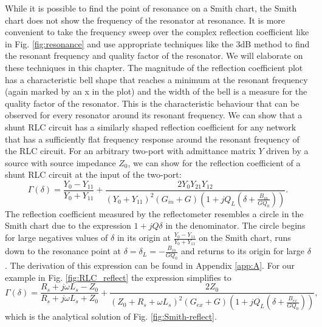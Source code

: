 While it is possible to find the point of resonance on a Smith chart, the Smith chart does not show the frequency of the resonator at resonance. It is more convenient to take the frequency sweep over the complex reflection coefficient like in Fig. \ref{fig:resonance} and use appropriate techniques like the 3dB method to find the resonant frequency and quality factor of the resonator. We will elaborate on these techniques in this chapter. The magnitude of the reflection coefficient plot has a characteristic bell shape that reaches a minimum at the resonant frequency (again marked by an x in the plot) and the width of the bell is a measure for the quality factor of the resonator. This is the characteristic behaviour that can be observed for every resonator around its resonant frequency. We can show that a shunt RLC circuit has a similarly shaped reflection coefficient for any network that has a sufficiently flat frequency response around the resonant frequency of the RLC circuit.
For an arbitrary two-port with admittance matrix $Y$ driven by a source with source impedance $Z_0$, we can show for the reflection coefficient of a shunt RLC circuit at the input of the two-port:
\begin{equation}\label{eq:gamma_r}
\Gamma(\delta)=\frac{Y_0-Y_{11}}{Y_0+Y_{11}}+\frac{2Y_0Y_{21}Y_{12}}{(Y_0+Y_{11})^2(G_{in}+G)(1+jQ_L(\delta+\frac{B_{in}}{GQ_0}))}\text{.}
\end{equation}
The reflection coefficient measured by the reflectometer resembles a circle in the Smith chart due to the expression $1+jQ\delta$ in the denominator. The circle begins for large negatives values of $\delta$ in its origin at $\frac{Y_0-Y_{11}}{Y_0+Y_{11}}$ on the Smith chart, runs down to the resonance point at $\delta=\delta_L=-\frac{B_{in}}{GQ_0} $ and returns to its origin for large $\delta$. The derivation of this expression can be found in Appendix \ref{app:A}. For our example in Fig. \ref{fig:RLC_reflect} the expression simplifies to
\begin{equation}\label{eq:gamma_rlc}
\Gamma(\delta)=\frac{R_s+j\omega L_s-Z_0}{R_s+j\omega L_s+Z_0}+\frac{2Z_0}{(Z_0+R_s+\omega L_s)^2(G_{ex}+G)(1+jQ_L(\delta+\frac{B_{ex}}{GQ_0}))}\text{,}
\end{equation}
which is the analytical solution of Fig. \ref{fig:Smith-reflect}.
